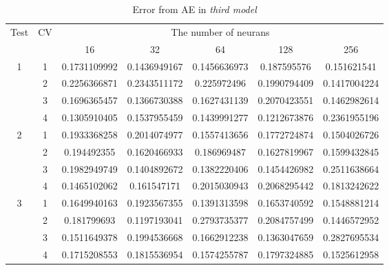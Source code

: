 \documentclass[draft,dvipsnames]{drexel-thesis}
\begin{document}
\begin{thesis}
\begin{table}[!t]
\centering
\caption{Error from AE in {\em third model}}
\label{tbl:mae_error}
\begin{tabular}{|c|c|c|c|c|c|c|}
\hline
\multirow{2}{*}{Test} & \multirow{2}{*}{CV} & \multicolumn{5}{c|}{The number of neurans}                                   \\ \cline{3-7} 
                      &                     & 16           & 32            & 64            & 128           & 256           \\ \hline
\multirow{4}{*}{1}    & 1                   & 0.1731109992 & 0.1436949167  & 0.1456636973  & 0.187595576   & 0.151621541   \\ \cline{2-7} 
                      & 2                   & 0.2256366871 & 0.2343511172  & 0.225972496   & 0.1990794409  & 0.1417004224  \\ \cline{2-7} 
                      & 3                   & 0.1696365457 & 0.1366730388  & 0.1627431139  & 0.2070423551  & 0.1462982614  \\ \cline{2-7} 
                      & 4                   & 0.1305910405 & 0.1537955459  & 0.1439991277  & 0.1212673876  & 0.2361955196  \\ \hline
\multirow{4}{*}{2}    & 1                   & 0.1933368258 & 0.2014074977  & 0.1557413656  & 0.1772724874  & 0.1504026726  \\ \cline{2-7} 
                      & 2                   & 0.194492355  & 0.1620466933  & 0.186969487   & 0.1627819967  & 0.1599432845  \\ \cline{2-7} 
                      & 3                   & 0.1982949749 & 0.1404892672  & 0.1382220406  & 0.1454426982  & 0.2511638664  \\ \cline{2-7} 
                      & 4                   & 0.1465102062 & 0.161547171   & 0.2015030943  & 0.2068295442  & 0.1813242622  \\ \hline
\multirow{4}{*}{3}    & 1                   & 0.1649940163 & 0.1923567355  & 0.1391313598  & 0.1653740592  & 0.1548881214  \\ \cline{2-7} 
                      & 2                   & 0.181799693  & 0.1197193041  & 0.2793735377  & 0.2084757499  & 0.1446572952  \\ \cline{2-7} 
                      & 3                   & 0.1511649378 & 0.1994536668  & 0.1662912238  & 0.1363047659  & 0.2827695534  \\ \cline{2-7} 
                      & 4                   & 0.1715208553 & 0.1815536954  & 0.1574255787  & 0.1797324885  & 0.1525612958  \\ \hline

\end{tabular}
\end{table}
\end{thesis}
\end{document}
